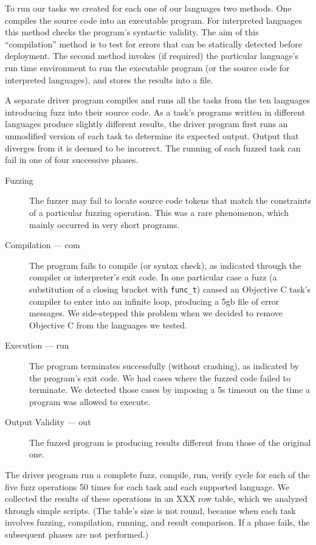 \documentclass[10pt]{sigplanconf}
\begin{document}
To run our tasks we created for each one of our languages two methods.
One compiles the source code into an executable program.
For interpreted languages this method checks the program's syntactic validity.
The aim of this ``compilation'' method is to test for errors that can
be statically detected before deployment.
The second method invokes (if required) the particular language's
run time environment to run the executable program
(or the source code for interpreted languages),
and stores the results into a file.

A separate driver program compiles and runs all the tasks from the ten
languages introducing fuzz into their source code.
As a task's programs written in different languages produce slightly
different results,
the driver program first runs an unmodified version of each task
to determine its expected output.
Output that diverges from it is deemed to be incorrect.
The running of each fuzzed task can fail in one of four successive
phases.
\begin{description}
\item[Fuzzing]
The fuzzer may fail to locate source code tokens that match the
constraints of a particular fuzzing operation.
This was a rare phenomenon, which mainly occurred in very short programs.
\item[Compilation --- com]
The program fails to compile (or syntax check),
as indicated through the compiler or interpreter's exit code.
In one particular case a fuzz
(a substitution of a closing bracket with {\tt func\_t})
caused an Objective C task's compiler
to enter into an infinite loop,
producing a 5{\sc gb} file of error messages.
We side-stepped this problem when we decided to remove Objective C from
the languages we tested.
\item[Execution --- run]
The program terminates successfully (without crashing),
as indicated by the program's exit code.
We had cases where the fuzzed code failed to terminate.
We detected those cases by imposing a 5s timeout on the time a program
was allowed to execute.
\item[Output Validity --- out]
The fuzzed program is producing results different from those of
the original one.
\end{description}

The driver program run a complete fuzz, compile, run, verify cycle
for each of the five fuzz operations 50 times for
each task and each supported language.
We collected the results of these operations in an XXX row table,
which we analyzed through simple scripts.
(The table's size is not round, because when each task involves
fuzzing, compilation, running, and result comparison.
If a phase fails, the subsequent phases are not performed.)
\end{document}
